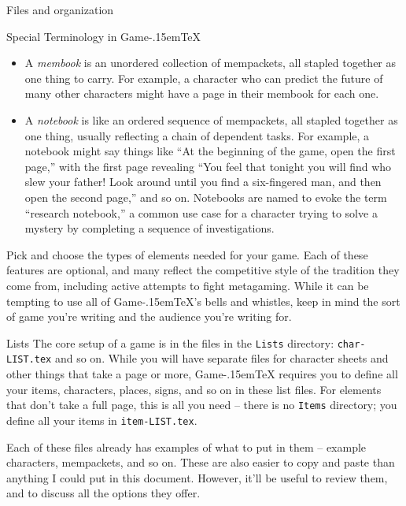 \documentclass[11pt]{article}
\def\gametex{\mbox{Game\kern-.15em\TeX}}
\begin{document}
\begin{section}{Files and organization}
\begin{subsection}{Special Terminology in \gametex{}}
\begin{itemize}
    \item A \textit{membook} is an unordered collection of mempackets, all stapled together as one thing to carry.  For example, a character who can predict the future of many other characters might have a page in their membook for each one.
    \item A \textit{notebook} is like an ordered sequence of mempackets, all stapled together as one thing, usually reflecting a chain of dependent tasks.  For example, a notebook might say things like ``At the beginning of the game, open the first page,'' with the first page revealing ``You feel that tonight you will find who slew your father!  Look around until you find a six-fingered man, and then open the second page,'' and so on.  Notebooks are named to evoke the term ``research notebook,'' a common use case for a character trying to solve a mystery by completing a sequence of investigations.
\end{itemize}

Pick and choose the types of elements needed for your game.  Each of these features are optional, and many reflect the competitive style of the tradition they come from, including active attempts to fight metagaming.  While it can be tempting to use all of \gametex{}'s bells and whistles, keep in mind the sort of game you're writing and the audience you're writing for.

\begin{subsubsection}{Lists}
\label{lists}
The core setup of a game is in the files in the \lstinline{Lists} directory: \lstinline{char-LIST.tex} and so on.
While you will have separate files for character sheets and other things that take a page or more, \gametex{} requires you to define all your items, characters, places, signs, and so on in these list files.
For elements that don't take a full page, this is all you need -- there is no \texttt{Items} directory; you define all your items in \lstinline{item-LIST.tex}.


Each of these files already has examples of what to put in them -- example characters, mempackets, and so on.  These are also easier to copy and paste than anything I could put in this document.
However, it'll be useful to review them, and to discuss all the options they offer.


\end{subsubsection}
\end{subsection}
\end{section}
\end{document}
